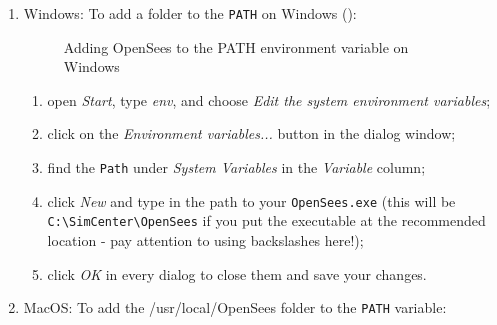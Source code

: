 \begin{enumerate}
\item Windows: To add a folder to the \texttt{PATH} on Windows ():

\begin{figure}[!htbp]
  \caption{Adding OpenSees to the PATH environment variable on Windows}
  \label{fig:add_env_path}
\end{figure}


\begin{enumerate}
    \item open \emph{Start}, type \emph{env}, and choose \emph{Edit the system environment variables};
    \item click on the \emph{Environment variables...} button in the dialog window;
    \item find the \texttt{Path} under \emph{System Variables} in the \emph{Variable} column;
    \item click \emph{New} and type in the path to your \texttt{OpenSees.exe} (this will be \texttt{C:\textbackslash SimCenter\textbackslash OpenSees} if you put the executable at the recommended location - pay attention to using backslashes here!);
    \item click \emph{OK} in every dialog to close them and save your changes.
\end{enumerate}

\item MacOS: To add the /usr/local/OpenSees folder to the \texttt{PATH} variable:



\end{enumerate}
